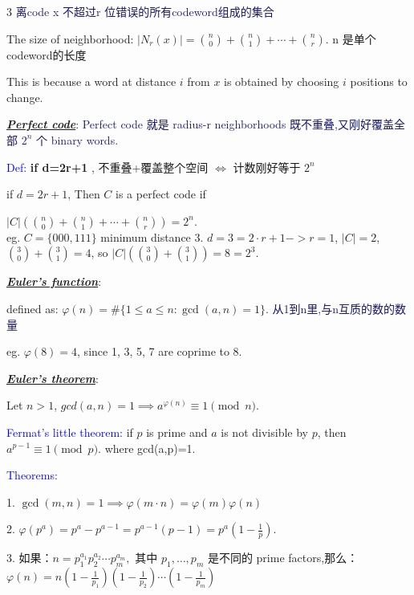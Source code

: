 \documentclass[12pt]{article}
\newcommand{\bulletPoint}[1]{\underline{\textit{\textbf{#1}}}}
\begin{document}
\begin{multicols*}{3}
{\fontsize{5.5pt}{5pt}\selectfont\textcolor{MidnightBlue}{离code x 不超过r 位错误的所有codeword组成的集合}}

The size of neighborhood: \textcolor{magenta!90!black}{ $ |N_r(x)|=\binom{n}{0}+\binom{n}{1}+\cdots+\binom{n}{r}.$ } n 是单个codeword的长度

This is because a word at distance $i$ from $x$ is obtained by choosing $i$ positions to change.

\bulletPoint{Perfect code}: 
{\fontsize{5pt}{5pt}\selectfont\textcolor{MidnightBlue}{Perfect code 就是 radius-r neighborhoods 既不重叠,又刚好覆盖全部 $2^n$ 个 binary words.}}

\textcolor{blue}{Def:} \textbf{ if d=2r+1 }, 不重叠+覆盖整个空间 $\Longleftrightarrow$ 计数刚好等于 $ 2^n $

if \textcolor{magenta!90!black}{$d=2r+1$},  Then $C$ is a perfect code if

\textcolor{magenta!90!black}{$ |C|\left(\binom{n}{0}+\binom{n}{1}+\cdots+\binom{n}{r}\right)=2^n.$} \\[3pt]

eg. $C=\{000,111\}$  minimum distance 3. $d=3=2\cdot r+1 -> r=1$, $|C|=2$, $\binom{3}{0}+\binom{3}{1}=4$, 
so $|C|(\binom{3}{0}+\binom{3}{1})=8=2^3.$


\bulletPoint{Euler's function}:

defined as: \textcolor{magenta!90!black}{$\varphi(n)=\#\{1 \leq a \leq n : \gcd(a,n)=1\}.$ }
 {\fontsize{5pt}{5pt}\selectfont\textcolor{MidnightBlue}{从1到n里,与n互质的数的数量}}

eg. $\varphi(8)=4$, since 1, 3, 5, 7 are coprime to 8.

\bulletPoint{Euler's theorem}:

Let $n>1$,  \textcolor{magenta!90!black}{ $gcd(a,n)=1\implies a^{\varphi(n)}\equiv 1\pmod n$.}

\textcolor{blue}{Fermat's little theorem:} if $p$ is prime and $a$ is not divisible by $p$, then $a^{p-1}\equiv 1\pmod p$. where gcd(a,p)=1.

\textcolor{blue}{Theorems:}

1. \textcolor{magenta!90!black}{$\gcd(m,n)=1 \implies \varphi(m·n)=\varphi(m)\varphi(n)$}

2. \textcolor{magenta!90!black}{$\varphi(p^a)=p^a-p^{a-1}=p^{a-1}(p-1)=p^a\left(1-\frac{1}{p}\right).$}

3. \textcolor{magenta!90!black} {如果：$
n=p_1^{a_1}p_2^{a_2}\cdots p_m^{a_m},$
其中 \(p_1,\ldots,p_m\) 是不同的 prime factors,那么：$
\varphi(n)
=
n\left(1-\frac{1}{p_1}\right)
\left(1-\frac{1}{p_2}\right)
\cdots
\left(1-\frac{1}{p_m}\right)$}


\end{multicols*}
\end{document}

